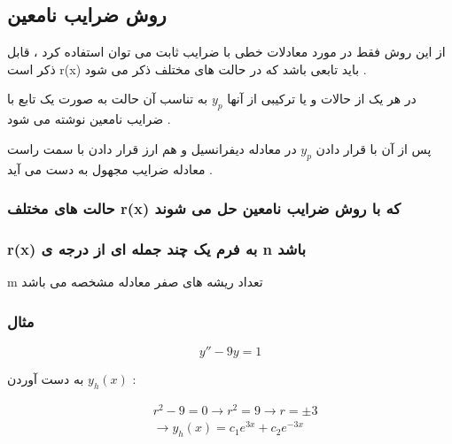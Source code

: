 \documentclass[12pt]{book}
\begin{document}
\subsection{روش ضرایب نامعین}

از این روش فقط در مورد معادلات خطی با ضرایب ثابت می توان استفاده کرد ، قابل ذکر است r(x) باید تابعی باشد که در حالت های مختلف ذکر می شود .

در هر یک از حالات و یا ترکیبی از آنها $y_{p}$ به تناسب آن حالت به صورت یک تابع با ضرایب نامعین نوشته می شود .

پس از آن با قرار دادن
$y_{p}$
در معادله دیفرانسیل و هم ارز قرار دادن با سمت راست معادله ضرایب مجهول به دست می آید .



\subsubsection{حالت های مختلف r(x) که با روش ضرایب نامعین حل می شوند}


\subsubsection{r(x) به فرم یک چند جمله ای از درجه ی n باشد}


\begin{tcolorbox}
\begin{center}
\end{center}
\end{tcolorbox}


m 
 تعداد ریشه های صفر معادله مشخصه می باشد


\subsubsection{مثال}

$$
y'' - 9y = 1
$$

به دست آوردن 
$y_{h}(x)$ :

\begin{align*}
&r^{2} - 9 = 0 \to r^{2} = 9 \to r = \pm 3 \\
&\to y_{h}(x) = c_{1}e^{3x} + c_{2}e^{-3x}
\end{align*}
\end{document}

